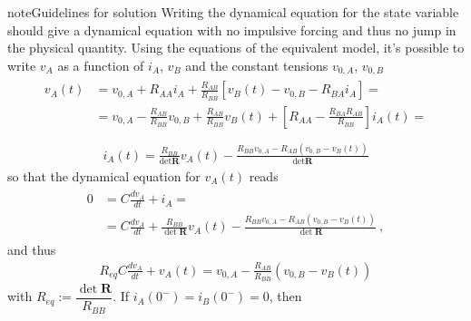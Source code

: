 \documentclass[letterpaper,10pt,italian]{jupyterBook}
\begin{document}
\begin{sphinxadmonition}{note}{Guidelines for solution}
\sphinxAtStartPar
{} Writing the dynamical equation for the state variable should give a dynamical equation with no impulsive forcing and thus no jump in the physical quantity. Using the equations of the equivalent model, it’s possible to write \(v_A\) as a function of \(i_A\), \(v_B\) and the constant tensions \(v_{0,A}\), \(v_{0,B}\)
\begin{equation*}
\begin{split}\begin{aligned}
  v_A(t) 
  & = v_{0,A} + R_{AA} i_A + \frac{R_{AB}}{R_{BB}} \left[ v_B(t) - v_{0,B} - R_{BA} i_A  \right] = \\
  & = v_{0,A} - \frac{R_{AB}}{R_{BB}} v_{0,B} + \frac{R_{AB}}{R_{BB}} v_{B}(t) + \left[ R_{AA} - \frac{R_{BA} R_{AB}}{R_{BB}} \right] i_A(t)  = \\
\end{aligned}\end{split}
\end{equation*}\begin{equation*}
\begin{split}i_A(t) = \frac{R_{BB}}{\text{det} \mathbf{R}} v_A(t) - \frac{R_{BB} v_{0,A} - R_{AB} ( v_{0,B}- v_{B}(t) ) }{\text{det} \mathbf{R}} \end{split}
\end{equation*}
\sphinxAtStartPar
so that the dynamical equation for \(v_A(t)\) reads
\begin{equation*}
\begin{split}\begin{aligned}
  0 
  & = C \frac{d v_A}{dt} + i_A = \\
  & = C \frac{d v_A}{dt} + \frac{R_{BB}}{\det \mathbf{R}} v_A(t) - \frac{R_{BB} v_{0,A} - R_{AB} ( v_{0,B}- v_{B}(t) ) }{\det \mathbf{R}} \ ,
\end{aligned}\end{split}
\end{equation*}
\sphinxAtStartPar
and thus
\begin{equation*}
\begin{split}R_{eq} C \frac{d v_A}{dt} + v_A(t) =  v_{0,A} - \frac{R_{AB}}{R_{BB}} ( v_{0,B}- v_{B}(t) )  \end{split}
\end{equation*}
\sphinxAtStartPar
with \(R_{eq} := \dfrac{\det \mathbf{R}}{R_{BB}}\). If \(i_A(0^-) = i_B(0^-) = 0\), then
\begin{equation*}
\begin{split}\begin{aligned}

\end{aligned}
\end{split}
\end{equation*}
\end{sphinxadmonition}
\end{document}
